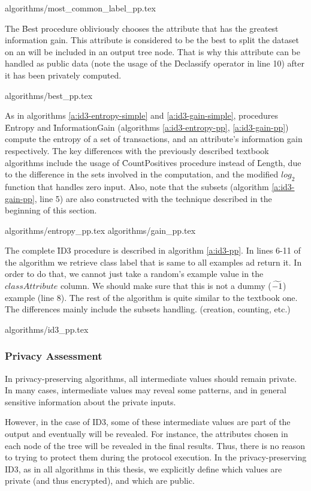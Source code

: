 {algorithms/most_common_label_pp.tex}

The \f{Best} procedure obliviously chooses the attribute that has the greatest information gain.
This attribute is considered to be the best to split the dataset on an will be included in an output tree node.
That is why this attribute can be handled as public data (note the usage of the \f{Declassify} operator in line 10) after it has been privately computed.


{algorithms/best_pp.tex}

As in algorithms \ref{a:id3-entropy-simple} and \ref{a:id3-gain-simple}, procedures \f{Entropy} and \f{InformationGain} (algorithms \ref{a:id3-entropy-pp}, \ref{a:id3-gain-pp}) compute the entropy of a set of transactions, and an attribute's information gain respectively.
The key differences with the previously described textbook algorithms include the usage of \f{CountPositives} procedure instead of \f{Length}, due to the difference in the sets involved in the computation, and the modified $log_2$ function that handles zero input.
Also, note that the subsets (algorithm \ref{a:id3-gain-pp}, line 5) are also constructed with the technique described in the beginning of this section.


{algorithms/entropy_pp.tex}
{algorithms/gain_pp.tex}

The complete \f{ID3} procedure is described in algorithm \ref{a:id3-pp}.
In lines 6-11 of the algorithm we retrieve class label that is same to all examples ad return it.
In order to do that, we cannot just take a random's example value in the $classAttribute$ column.
We should make sure that this is not a dummy ($\widetilde{-1}$) example (line 8).
The rest of the algorithm is quite similar to the textbook one.
The differences mainly include the subsets handling. (creation, counting, etc.)


{algorithms/id3_pp.tex}


\subsubsection{Privacy Assessment}\label{s:id3-privacy-assessment}

In privacy-preserving algorithms, all intermediate values should remain private.
In many cases, intermediate values may reveal some patterns, and in general sensitive information about the private inputs.

However, in the case of ID3, some of these intermediate values are part of the output and eventually will be revealed.
For instance, the attributes chosen in each node of the tree will be revealed in the final results.
Thus, there is no reason to trying to protect them during the protocol execution.
In the privacy\hyp preserving ID3, as in all algorithms in this thesis, we explicitly define which values are private (and thus encrypted), and which are public.

